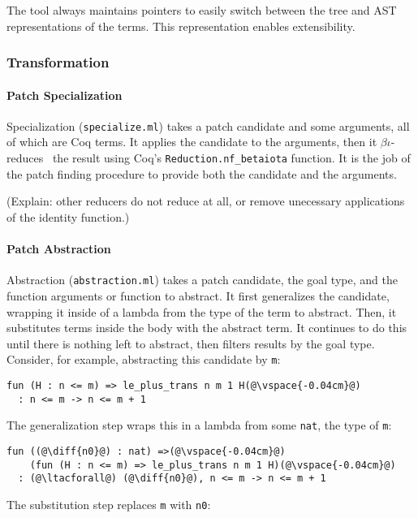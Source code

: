 The tool always maintains pointers to easily switch between the tree and AST representations of the terms.
This representation enables extensibility.

\subsubsection{Transformation}
\label{sec:pumpkin-impl-trans}

\paragraph{Patch Specialization} Specialization (\lstinline{specialize.ml}) takes a patch candidate and some arguments,
all of which are Coq terms.
It applies the candidate to the arguments, then it $\beta\iota$-reduces~\cite{equality} the result using Coq's
\lstinline{Reduction.nf_betaiota} function. It is the job of the 
patch finding procedure to provide both the candidate and the arguments.

(Explain: other reducers do not reduce at all, or remove unecessary applications of the identity function.)

\paragraph{Patch Abstraction} Abstraction (\lstinline{abstraction.ml}) takes a patch candidate, 
the goal type, and the function arguments or function to abstract.
It first generalizes the candidate, wrapping it inside of a lambda from the type of the term to abstract.
Then, it substitutes terms inside the body with the abstract term.
It continues to do this until there is nothing left to abstract, then filters results by the goal type.
Consider, for example, abstracting this candidate by \lstinline{m}:

\begin{lstlisting}[language=coq]
  fun (H : n <= m) => le_plus_trans n m 1 H(@\vspace{-0.04cm}@)
  : n <= m -> n <= m + 1
\end{lstlisting}
The generalization step wraps this in a lambda from some \lstinline{nat}, the type of \lstinline{m}:

\begin{lstlisting}[language=coq]
  fun ((@\diff{n0}@) : nat) =>(@\vspace{-0.04cm}@)
    (fun (H : n <= m) => le_plus_trans n m 1 H)(@\vspace{-0.04cm}@)
  : (@\ltacforall@) (@\diff{n0}@), n <= m -> n <= m + 1
\end{lstlisting}
The substitution step replaces \lstinline{m} with \lstinline{n0}:

